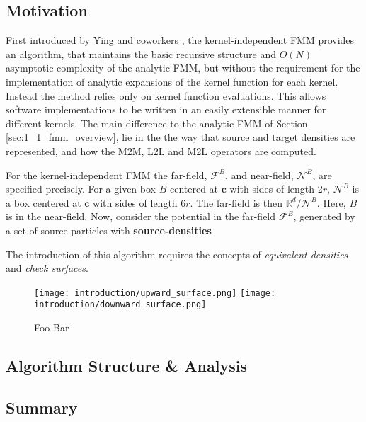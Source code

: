 \subsection{Motivation}

First introduced by Ying and coworkers \cite{Ying:2004:JCP}, the kernel-independent FMM
provides an algorithm, that maintains the basic recursive structure and $O(N)$
asymptotic complexity of the analytic FMM, but without the requirement for the
implementation of analytic expansions of the kernel function for each kernel.
Instead the method relies only on kernel function evaluations. This allows
software implementations to be written in an easily extensible manner for different
kernels. The main difference to the analytic FMM of Section \ref{sec:1_1_fmm_overview},
lie in the the way that source and target densities are represented, and how
the M2M, L2L and M2L operators are computed.

For the kernel-independent FMM the \gls{far-field}, $\mathcal{F}^B$, and
\gls{near-field}, $\mathcal{N}^B$, are specified precisely. For a given box $B$
centered at $\mathbf{c}$ with sides of length 2$r$, $\mathcal{N}^B$ is a box
centered at $\mathbf{c}$ with sides of length 6$r$. The \gls{far-field} is then
$\mathbb{R}^d / \mathcal{N}^B$. Here, $B$ is in the \gls{near-field}. Now,
consider the potential in the \gls{far-field} $\mathcal{F}^B$, generated by a
set of \gls{source-particles} with \textbf{\gls{source-densities}}

The introduction of this algorithm requires the concepts of \textit{equivalent densities}
and \textit{check surfaces}.


\begin{figure}[!h]
    \centering
    {\texttt{[image: introduction/upward\_surface.png]}}
    \hfill
  {\texttt{[image: introduction/downward\_surface.png]}}
  \vspace{0pt}
  \caption{Foo Bar}

  \label{fig:1_2_upward_downward_surfaces}
\end{figure}

\subsection{Algorithm Structure \& Analysis}


\subsection{Summary}

